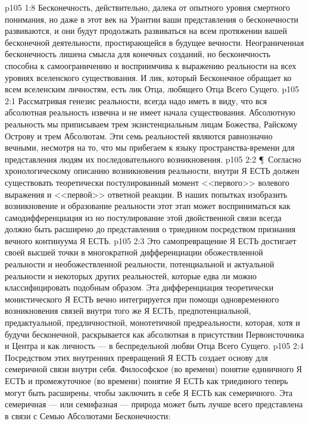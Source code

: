 \vs p105 1:8 Бесконечность, действительно, далека от опытного уровня смертного понимания, но даже в этот век на Урантии ваши представления о бесконечности развиваются, и они будут продолжать развиваться на всем протяжении вашей бесконечной деятельности, простирающейся в будущее вечности. Неограниченная бесконечность лишена смысла для конечных созданий, но бесконечность способна к самоограничению и восприимчива к выражению реальности на всех уровнях вселенского существования. И лик, который Бесконечное обращает ко всем вселенским личностям, есть лик Отца, любящего Отца Всего Сущего.
\vs p105 2:1 Рассматривая генезис реальности, всегда надо иметь в виду, что вся абсолютная реальность извечна и не имеет начала существования. Абсолютную реальность мы приписываем трем экзистенциальным лицам Божества, Райскому Острову и трем Абсолютам. Эти семь реальностей являются равнозначно вечными, несмотря на то, что мы прибегаем к языку пространства\hyp{}времени для представления людям их последовательного возникновения.
\vs p105 2:2 \P\ Согласно хронологическому описанию возникновения реальности, внутри Я ЕСТЬ должен существовать теоретически постулированный момент <<первого>> волевого выражения и <<первой>> ответной реакции. В наших попытках изобразить возникновение и образование реальности этот этап может восприниматься как самодифференциация  из  но постулирование этой двойственной связи всегда должно быть расширено до представления о триедином посредством признания вечного континуума  Я ЕСТЬ.
\vs p105 2:3 Это самопревращение Я ЕСТЬ достигает своей высшей точки в многократной дифференциации обожествленной реальности и необожествленной реальности, потенциальной и актуальной реальности и некоторых других реальностей, которые едва ли можно классифицировать подобным образом. Эта дифференциация теоретически монистического Я ЕСТЬ вечно интегрируется при помощи одновременного возникновения связей внутри того же Я ЕСТЬ, предпотенциальной, предактуальной, предличностной, монотетичной предреальности, которая, хотя и будучи бесконечной, раскрывается как абсолютная в присутствии Первоисточника и Центра и как личность --- в беспредельной любви Отца Всего Сущего.
\vs p105 2:4 Посредством этих внутренних превращений Я ЕСТЬ создает основу для семеричной связи внутри себя. Философское (во времени) понятие единичного Я ЕСТЬ и промежуточное (во времени) понятие Я ЕСТЬ как триединого теперь могут быть расширены, чтобы заключить в себе Я ЕСТЬ как семеричного. Эта семеричная --- или семифазная --- природа может быть лучше всего представлена в связи с Семью Абсолютами Бесконечности:
